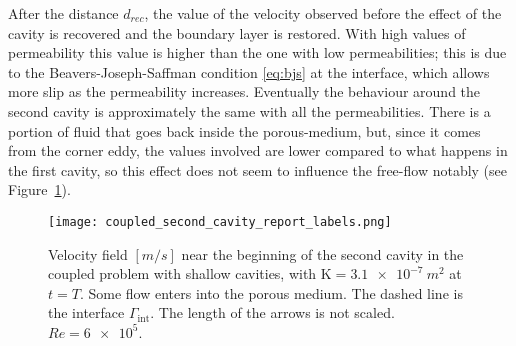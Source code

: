 After the distance $d_{rec}$, the value of the velocity observed 
before the effect of the cavity is recovered and the boundary layer is 
restored. With high values of permeability this value is higher than the one 
with low permeabilities; this is due to the Beavers-Joseph-Saffman condition 
\eqref{eq:bjs} at the interface, which allows more slip as the permeability 
increases. Eventually the behaviour around the 
second cavity is approximately the same with all the permeabilities. There is a 
portion of fluid that goes back inside the porous-medium, but, since it comes 
from the corner eddy, the values involved are lower compared to what happens in 
the first cavity, so this effect does not seem to influence the free-flow 
notably (see Figure~\ref{fig:coupledsecondcav}).
\begin{figure}
	\centering
	\texttt{[image: coupled\_second\_cavity\_report\_labels.png]}
	\caption[Velocity field near the beginning of the second cavity in the coupled problem with shallow cavities]{Velocity field $[\si{m/s}]$ near the beginning of the second cavity in the coupled problem with shallow cavities, with $\mathrm{K}=\SI{3.1e-7}{m^2}$ at $t=T$. Some flow enters into the porous medium. The dashed line is the interface $\Gamma_\text{int}$. The length of the arrows is not scaled. $Re=\num{6e5}$.}
	\label{fig:coupledsecondcav}
\end{figure}

